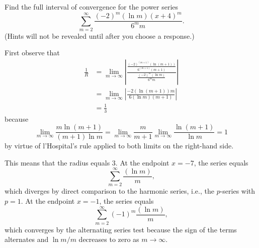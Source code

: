 \documentclass{ximera}
\begin{document}
\begin{question}%

Find the full interval of convergence for the power series \[\sum_{m=2}^{\infty} \frac{(-2)^m(\ln m)(x + 4)^m }{6^mm}.\]
(Hints will not be revealed until after you choose a response.)
\begin{multiplechoice}
\choice{\(\displaystyle \left[-\frac{13}{3},-\frac{11}{3}\right)\)}
\choice[correct]{\(\displaystyle \left(-7,-1\right]\)}
\choice{\(\displaystyle \left[-7,-1\right]\)}
\choice{\(\displaystyle \left(-\infty,\infty\right)\)}
\end{multiplechoice}
\begin{feedback}
First observe that 
\[\begin{aligned}
\frac{1}{R} & = \lim_{m\rightarrow \infty} \left| \frac{\frac{(-2)^{(m+1)}(\ln {(m+1)}) }{6^{(m+1)}{(m+1)}} }{\frac{(-2)^m(\ln m) }{6^mm}} \right| \\
& = \lim_{m\rightarrow \infty} \left| \frac{-2(\ln {(m+1)})m }{6(\ln m){(m+1)} } \right| \\
& = \frac{1}{3}
\end{aligned}\]
because \[\lim_{m \rightarrow \infty} \frac{m\ln (m+1)}{(m+1) \ln m} = \lim_{m \rightarrow \infty} \frac{m}{m+1} \lim_{m \rightarrow \infty} \frac{\ln (m+1)}{\ln m} = 1\] by virtue of l'Hospital's rule applied to both limits on the right-hand side. \begin{hint}
This means that the radius equals \(3\). At the endpoint \(x=-7\), the series equals \[\sum_{m=2}^{\infty} \frac{(\ln m) }{m },\] which diverges by direct comparison to the harmonic series, i.e., the \(p\)-series with \(p = 1\). At the endpoint \(x=-1\), the series equals \[\sum_{m=2}^{\infty} (-1)^m\frac{(\ln m) }{m },\] which converges by the alternating series test because the sign of the terms alternates and \(\ln m / m\) decreases to zero as \(m \rightarrow \infty\). \end{hint}
\end{feedback}

\end{question}
\end{document}
